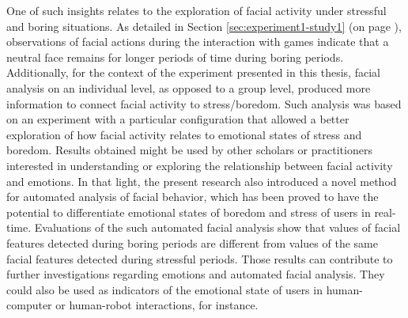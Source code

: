 One of such insights relates to the exploration of facial activity under stressful and boring situations. As detailed in Section \ref{sec:experiment1-study1} (on page \pageref{sec:experiment1-study1}), observations of facial actions during the interaction with games indicate that a neutral face remains for longer periods of time during boring periods. Additionally, for the context of the experiment presented in this thesis, facial analysis on an individual level, as opposed to a group level, produced more information to connect facial activity to stress/boredom. Such analysis was based on an experiment with a particular configuration that allowed a better exploration of how facial activity relates to emotional states of stress and boredom. Results obtained might be used by other scholars or practitioners interested in understanding or exploring the relationship between facial activity and emotions. In that light, the present research also introduced a novel method for automated analysis of facial behavior, which has been proved to have the potential to differentiate emotional states of boredom and stress of users in real-time. Evaluations of the such automated facial analysis show that values of facial features detected during boring periods are different from values of the same facial features detected during stressful periods. Those results can contribute to further investigations regarding emotions and automated facial analysis. They could also be used as indicators of the emotional state of users in human-computer or human-robot interactions, for instance.



